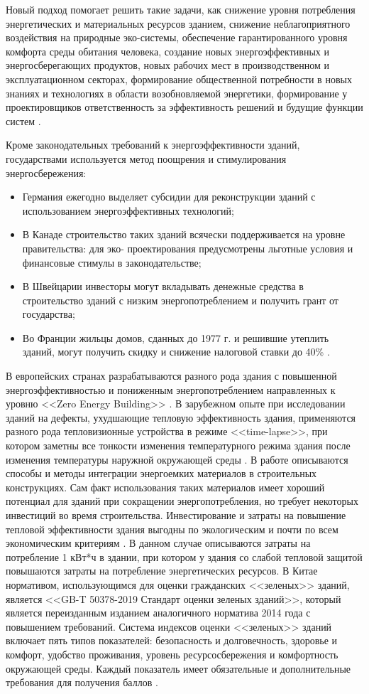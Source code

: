 Новый подход помогает решить такие задачи, как снижение уровня потребления энергетических и материальных ресурсов зданием,
снижение неблагоприятного воздействия на природные эко-системы, обеспечение гарантированного уровня комфорта среды обитания человека,
создание новых энергоэффективных и энергосберегающих продуктов, новых рабочих мест в производственном и эксплуатационном секторах,
формирование общественной потребности в новых знаниях и технологиях в области возобновляемой энергетики, формирование у проектировщиков ответственность за
эффективность решений и будущие функции систем \Code{[6]}.

Кроме законодательных требований к энергоэффективности зданий, государствами используется метод поощрения и стимулирования энергосбережения:
\begin{itemize}
    \item Германия ежегодно выделяет субсидии для реконструкции зданий с использованием энергоэффективных технологий;
    \item В Канаде строительство таких зданий всячески поддерживается на уровне правительства: для эко- проектирования предусмотрены льготные условия и финансовые стимулы в законодательстве;
    \item В Швейцарии инвесторы могут вкладывать денежные средства в строительство зданий с низким энергопотреблением и получить грант от государства;
    \item Во Франции жильцы домов, сданных до 1977 г. и решившие утеплить зданий, могут получить скидку и снижение налоговой ставки до 40\% \Code{[7]}.
\end{itemize}


В европейских странах разрабатываются разного рода здания с повышенной энергоэффективностью и пониженным энергопотреблением направленных к уровню <<Zero Energy Building>> \Code{[8]}.
В зарубежном опыте при исследовании зданий на дефекты, ухудшающие тепловую эффективность здания, применяются разного рода тепловизионные устройства в режиме <<time-lapse>>,
при котором заметны все тонкости изменения температурного режима здания после изменения температуры наружной окружающей среды \Code{[9, 10]}.
В работе \Code{[11]} описываются способы и методы интеграции энергоемких материалов в строительных конструкциях.
Сам факт использования таких материалов имеет хороший потенциал для зданий при сокращении энергопотребления, но требует некоторых инвестиций во время строительства. Инвестирование и затраты на повышение тепловой эффективности здания выгодны по экологическим и почти по всем экономическим критериям \Code{[12]}. В данном случае описываются затраты на потребление 1 кВт*ч в здании, при котором у здания со слабой тепловой защитой повышаются затраты на потребление энергетических ресурсов. 
В Китае нормативом, использующимся для оценки гражданских <<зеленых>> зданий, является <<GB-T 50378-2019 Стандарт оценки зеленых зданий>>,
который является переизданным изданием аналогичного норматива 2014 года с повышением требований.
Система индексов оценки <<зеленых>> зданий включает пять типов показателей: безопасность и долговечность, здоровье и комфорт, удобство проживания,
уровень ресурсосбережения и комфортность окружающей среды. Каждый показатель имеет обязательные и дополнительные требования для получения баллов \Code{[13]}.



